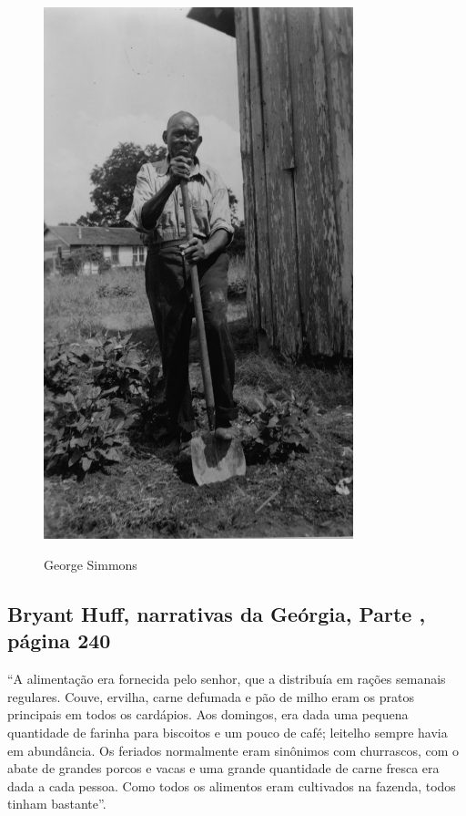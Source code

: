 \pagebreak
\thispagestyle{empty}
\begin{figure}[!ht]
\centering
 \includegraphics[width=90mm]{./imgs/geosimmons_recorte.jpg} \label{img5}
\caption{George Simmons}
\end{figure}

\subsection{Bryant Huff, narrativas da Geórgia, Parte , página 240}
\label{ref151}

``A alimentação era fornecida pelo senhor, que a distribuía em rações
semanais regulares. Couve, ervilha, carne defumada e pão de milho eram
os pratos principais em todos os cardápios. Aos domingos, era dada uma
pequena quantidade de farinha para biscoitos e um pouco de café;
leitelho sempre havia em abundância. Os feriados normalmente eram
sinônimos com churrascos, com o abate de grandes porcos e vacas e uma %
grande quantidade de carne fresca era dada a cada pessoa. Como todos os
alimentos eram cultivados na fazenda, todos tinham bastante''.

